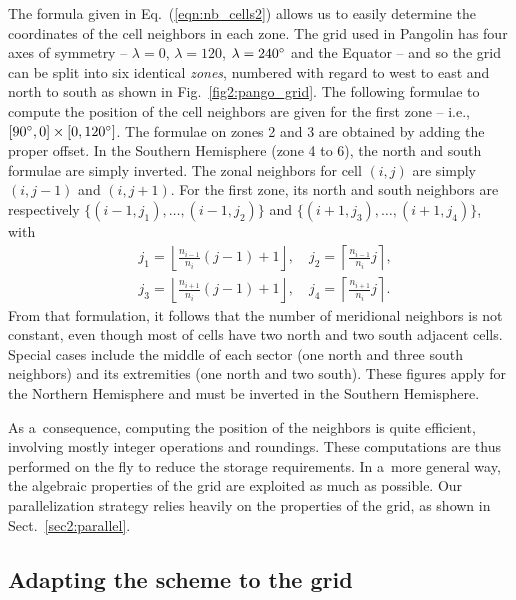    The formula given in Eq.~(\ref{eqn:nb_cells2}) allows us to easily
   determine the coordinates of the cell neighbors in each zone. The
   grid used in Pangolin has four axes of symmetry -- $\lambda=0$,
   $\lambda=120$, $\lambda=240^{\circ}$ and the Equator -- and so the grid
   can be split into six identical \textit{zones}, numbered with regard to west
   to east and north to south as shown in Fig.~\ref{fig2:pango_grid}.
   The following formulae to compute the position of the cell
   neighbors are given for the first zone -- i.e.,
   $[90^{\circ},0]\times[0,120^{\circ}]$. The formulae on zones 2 and 3
   are obtained by adding the proper offset. In the Southern
   Hemisphere (zone 4 to 6), the north and south formulae are simply
   inverted. The zonal neighbors for cell $(i,j)$ are simply
   $(i,j-1)$ and $(i,j+1)$. For the first zone, its north and south
   neighbors are respectively $\big\{(i-1,j_1), \ldots, (i-1,
   j_2)\big\}$ and $\big\{(i+1,j_3), \ldots, (i+1, j_4)\big\}$,
   with
\begin{align}
&j_1 = \left\lfloor \frac{n_{i-1}}{n_i}(j-1)+1\right\rfloor,\quad
j_2 = \left\lceil \frac{n_{i-1}}{n_i}j\right\rceil,\nonumber\\
&j_3 = \left\lfloor \frac{n_{i+1}}{n_i}(j-1)+1\right\rfloor,\quad
j_4 = \left\lceil \frac{n_{i+1}}{n_i}j\right\rceil.
  \label{eqn:neighb_merid2}
   \end{align}
   From that formulation, it follows that the number of meridional
   neighbors is not constant, even though most of cells have two
   north and two south adjacent cells.  Special cases include the
   middle of each sector (one north and three south neighbors) and
   its extremities (one north and two south). These figures apply for
   the Northern Hemisphere and must be inverted in the Southern
   Hemisphere.

   As a~consequence, computing the position of the neighbors is quite
   efficient, involving mostly integer operations and roundings. These
   computations are thus performed on the fly to reduce the storage
   requirements. In a~more general way, the algebraic properties of the grid are
   exploited as much as possible. Our parallelization strategy relies heavily on the properties of the grid, as shown in Sect.~\ref{sec2:parallel}.



\subsection{Adapting the scheme to the grid}
   \label{subsec:adapting}

